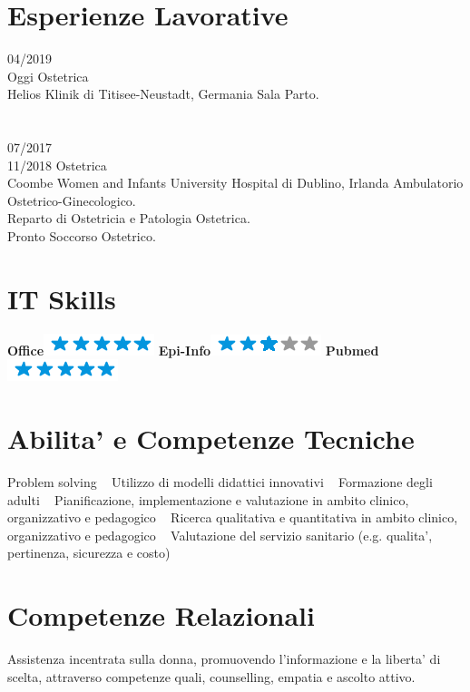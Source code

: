 \documentclass[11pt]{friggeri-cv}
\begin{document}
\vspace{-20pt}
\section{Esperienze Lavorative}
\begin{entrylist}
  \entry
  {04/2019\\Oggi}
  {Ostetrica}
  {\\Helios Klinik di Titisee-Neustadt, Germania}
  {Sala Parto.}
  \\ \\ \\
  \entry
  {07/2017\\11/2018}
  {Ostetrica}
  {\\Coombe Women and Infants University Hospital di Dublino, Irlanda}
  {Ambulatorio Ostetrico-Ginecologico.\\
    Reparto di Ostetricia e Patologia Ostetrica.\\
    Pronto Soccorso Ostetrico.}
\end{entrylist}
\vspace{-10pt}
\begin{aside}
  \section{IT Skills}
  \textbf{Office}\includegraphics[scale=0.40]{img/5stars.png}
  \textbf{Epi-Info}\includegraphics[scale=0.40]{img/3stars.png}
  \textbf{Pubmed}\includegraphics[scale=0.40]{img/5stars.png}
  \section{Abilita' e Competenze Tecniche}\footnotesize{
    Problem solving 
    ~
    Utilizzo di modelli didattici innovativi
    ~
    Formazione degli adulti
    ~
    Pianificazione, implementazione e valutazione in ambito clinico, organizzativo e 
    pedagogico 
    ~
    Ricerca qualitativa e quantitativa in ambito clinico, organizzativo e pedagogico 
    ~
    Valutazione del servizio sanitario (e.g. qualita', pertinenza, sicurezza e 
    costo)}
  \section{Competenze Relazionali}\footnotesize{
  Assistenza incentrata sulla donna, promuovendo l'informazione e la 
  liberta' di scelta, attraverso competenze quali, counselling, empatia e 
  ascolto attivo.}
\end{aside}
\end{document}
